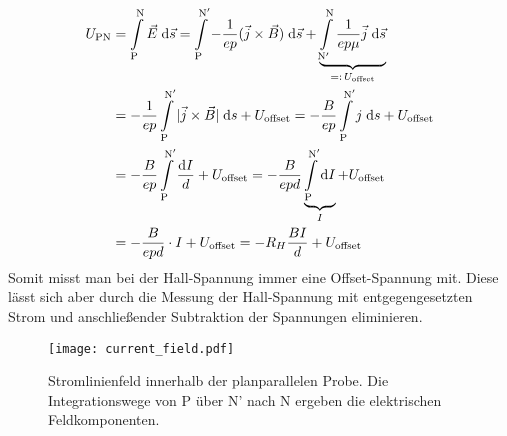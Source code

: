 \begin{align}
U_\text{PN}&=\int\limits_{\mathrm{P}}^{\mathrm{N}}\vec{E}\;\mathrm{d} \vec{s}
=\int\limits_{\mathrm{P}}^{\mathrm{N}^\prime}-\frac{1}{ep}(\vec{j}\times \vec{B})\;\mathrm{d}\vec{s}
+\underbrace{\int\limits_{\mathrm{N}^\prime}^{\mathrm{N}}\frac{1}{ep\mu}\vec{j}\;\mathrm{d} \vec{s}}_{=:\, U_\text{offset}}\notag\\
&=-\frac{1}{ep}\int\limits_{\mathrm{P}}^{\mathrm{N}^\prime}|\vec{j}\times\vec{B}|\;\mathrm{d} s  +  U_\text{offset}
=-\frac{B}{ep}\int\limits_{\mathrm{P}}^{\mathrm{N}^\prime}j\;\mathrm{d} s  +  U_\text{offset}\notag\\
&=-\frac{B}{ep}\int\limits_{\mathrm{P}}^{\mathrm{N}^\prime}\frac{\mathrm{d} I}{d}  +  U_\text{offset}
=-\frac{B}{epd}\underbrace{\int\limits_{\mathrm{P}}^{\mathrm{N}^\prime}\mathrm{d} I}_{I}  +  U_\text{offset}\notag\\
&=-\frac{B}{epd}\cdot I +U_\text{offset}=-R_H\frac{BI}{d}+U_\text{offset}
\label{eq:U_offset}
\end{align}
Somit misst man bei der Hall-Spannung immer eine Offset-Spannung mit. Diese lässt sich aber durch die Messung der Hall-Spannung mit entgegengesetzten Strom und anschließender Subtraktion der Spannungen eliminieren.

\begin{figure}[h]
\centering
\texttt{[image: current\_field.pdf]}
\caption{Stromlinienfeld innerhalb der planparallelen Probe. Die Integrationswege von P über N' nach N ergeben die elektrischen Feldkomponenten.}
\label{fig:current_field}
\end{figure}